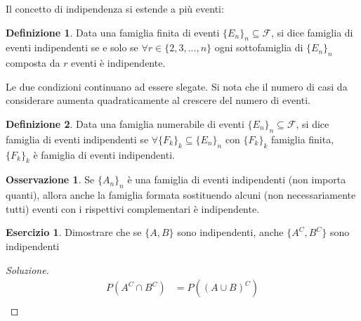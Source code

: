 \documentclass{article}
\theoremstyle{plain}
\theoremstyle{definition}
\newtheorem{definizione}{Definizione}[section]
\newtheorem{osservazione}{Osservazione}[section]
\newtheorem{esercizio}{Esercizio}[section]
\theoremstyle{remark}
\newenvironment{soluzione}
	{\renewcommand\qedsymbol{$\mathwitch*$}\begin{proof}[Soluzione]}
	{\end{proof}}
\renewcommand{\qedsymbol}{$\mathrightghost$}
\begin{document}
Il concetto di indipendenza si estende a più eventi:
\begin{definizione}
	Data una famiglia finita di eventi $\{E_n\}_n\subseteq\mathcal{F}$, si dice famiglia di eventi indipendenti se e solo se $\forall r\in \{2,3,...,n\}$ ogni sottofamiglia di $\{E_n\}_n$ composta da $r$ eventi è indipendente.
\end{definizione}
Le due condizioni continuano ad essere slegate. Si nota che il numero di casi da considerare aumenta quadraticamente al crescere del numero di eventi.
\begin{definizione}
	Data una famiglia numerabile di eventi $\{E_n\}_n\subseteq\mathcal{F}$, si dice famiglia di eventi indipendenti se $\forall \{F_k\}_k\subseteq\{E_n\}_n$ con $\{F_k\}_k$ famiglia finita, $\{F_k\}_k$ è famiglia di eventi indipendenti.
\end{definizione}
\begin{osservazione}
	Se $\{A_n\}_n$ è una famiglia di eventi indipendenti (non importa quanti), allora anche la famiglia formata sostituendo alcuni (non necessariamente tutti) eventi con i rispettivi complementari è indipendente.
\end{osservazione}
\begin{esercizio}
	Dimostrare che se $\{A,B\}$ sono indipendenti, anche $\{A^C,B^C\}$ sono indipendenti
	\begin{soluzione}
		\begin{align*}
			P(A^C\cap B^C)&=P((A\cup B)^C)\\
			&%
		\end{align*}
	\end{soluzione}
\end{esercizio}
\end{document}
